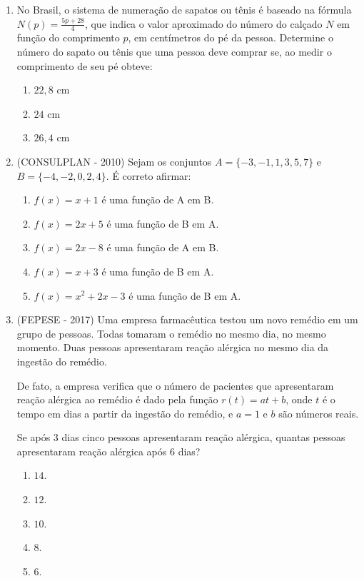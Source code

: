 \begin{enumerate}
  \item No Brasil, o sistema de numeração de sapatos ou tênis é baseado na fórmula $N(p)= \frac{5p + 28}{4}$, que indica o valor aproximado do
  número do calçado $N$ em função do comprimento $p$, em centímetros do pé da pessoa. Determine o número do sapato ou tênis que uma pessoa deve
  comprar se, ao medir o comprimento de seu pé obteve:
  \begin{enumerate}
  \item $22,8$ cm
  \item $24$ cm
  \item $26,4$ cm
  \end{enumerate}

  \item (CONSULPLAN - 2010) Sejam os conjuntos $A = \{- 3, - 1, 1, 3, 5, 7\}$ e $B = \{- 4, -2, 0, 2, 4\}$. É correto afirmar:
  \begin{enumerate}
  \item $f(x) = x + 1$ é uma função de A em B.
  \item $f(x) = 2x + 5$ é uma função de B em A.
  \item $f(x) = 2x - 8$ é uma função de A em B.
  \item $f(x) = x + 3$ é uma função de B em A.
  \item $f(x) = x^2 + 2x - 3$ é uma função de B em A.
 \end{enumerate}

 \item (FEPESE - 2017) Uma empresa farmacêutica testou um novo remédio em um grupo de pessoas. Todas tomaram o remédio no mesmo dia, no mesmo momento. Duas pessoas apresentaram reação alérgica no mesmo dia da ingestão do remédio.

 De fato, a empresa verifica que o número de pacientes que apresentaram reação alérgica ao remédio é dado pela função $r(t) = a t + b$, onde $t$ é o tempo em dias a partir da ingestão do remédio, e $a= 1$ e $b$ são números reais.

 Se após $3$ dias cinco pessoas apresentaram reação alérgica, quantas pessoas apresentaram reação alérgica após $6$ dias?
 \begin{enumerate}
  \item $14$.
  \item $12$.
  \item $10$.
  \item $8$.
  \item $6$.
 \end{enumerate}


\end{enumerate}
